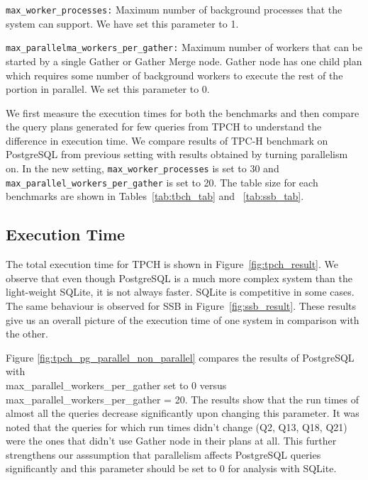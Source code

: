 \texttt{max\_worker\_processes:} Maximum number of background processes that the system can support.
We have set this parameter to 1.

\texttt{max\_parallelma\_workers\_per\_gather:} Maximum number of workers that can be started by a single Gather or Gather Merge node. Gather node has one child plan which requires some number of background workers to execute the rest of the portion in parallel. We set this parameter to 0.

We first measure the execution times for both the benchmarks and then compare the query plans generated for few queries from TPCH to understand the difference in execution time. We compare results of TPC-H benchmark on PostgreSQL from previous setting with results obtained by turning parallelism on. In the new setting, \texttt{max\_worker\_processes} is set to 30 and \texttt{max\_parallel\_workers\_per\_gather} is set to 20. The table size for each benchmarks are shown in Tables~\ref{tab:tbch_tab} and ~\ref{tab:ssb_tab}.

\subsection{Execution Time}
\label{sec:time}


The total execution time for TPCH is shown in Figure~\ref{fig:tpch_result}. We observe that even though PostgreSQL is a much more complex system than the light-weight SQLite, it is not always faster. SQLite is competitive in some cases. The same behaviour is observed for SSB in Figure~\ref{fig:ssb_result}. These results give us an overall picture of the execution time of one system in comparison with the other.

Figure \ref{fig:tpch_pg_parallel_non_parallel} compares the results of PostgreSQL with \\ max\_parallel\_workers\_per\_gather set to 0 versus \\ max\_parallel\_workers\_per\_gather = 20. The results show that the run times of almost all the queries decrease significantly upon changing this parameter. It was noted that the queries for which run times didn't change (Q2, Q13, Q18, Q21) were the ones that didn't use Gather node in their plans at all. This further strengthens our asssumption that parallelism affects PostgreSQL queries significantly and this parameter should be set to 0 for analysis with SQLite.



